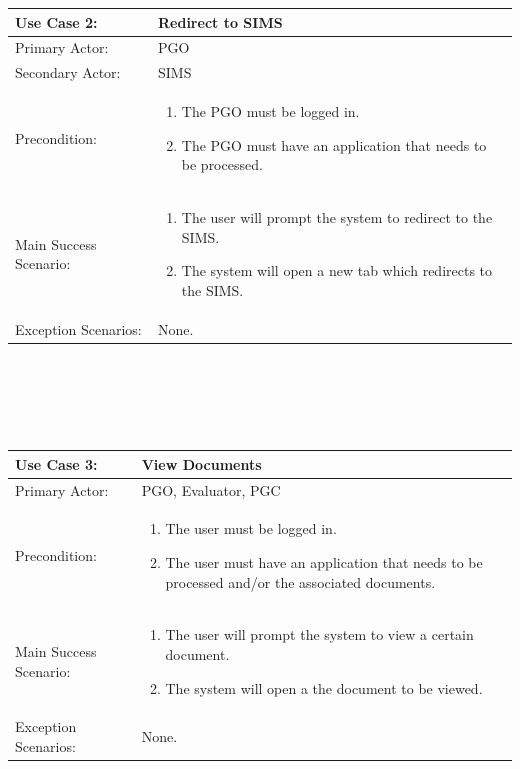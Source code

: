 \documentclass{article}
\begin{document}
\begin{tabular} {| m{5cm} | m{10cm} |}
\hline
Use Case 2: & Redirect to SIMS \\
\hline
Primary Actor: & PGO \\
\hline
Secondary Actor: & SIMS \\
\hline
Precondition: & \begin{enumerate} \itemsep0em \item The PGO must be logged in. \item The PGO must have an application that needs to be processed. \end{enumerate} \\
\hline
Main Success Scenario: & \begin{enumerate} \itemsep0em \item The user will prompt the system to redirect to the SIMS. \item The system will open a new tab which redirects to the SIMS. \end{enumerate}\\
\hline
Exception Scenarios: & None. \\
\hline
\end{tabular}
\\ \\ \\ \\
\begin{tabular} {| m{5cm} | m{10cm} |}
\hline
Use Case 3: & View Documents \\
\hline
Primary Actor: & PGO, Evaluator, PGC \\
\hline
Precondition: & \begin{enumerate} \itemsep0em \item The user must be logged in. \item The user must have an application that needs to be processed and/or the associated documents. \end{enumerate} \\
\hline
Main Success Scenario: & \begin{enumerate} \itemsep0em \item The user will prompt the system to view a certain document. \item The system will open a the document to be viewed. \end{enumerate} \\
\hline
Exception Scenarios: & None. \\
\hline
\end{tabular}
\\ \\ \\ \\
\end{document}
